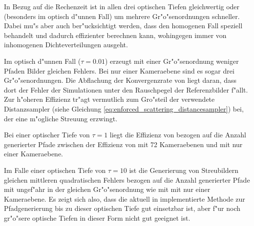 	In Bezug auf die Rechenzeit ist \pirate in allen drei optischen Tiefen gleichwertig oder (besonders im optisch d"unnen Fall) um mehrere Gr"o"senordnungen schneller. Dabei mu"s aber auch ber"ucksichtigt werden, dass \pirate den homogenen Fall speziell behandelt und dadurch effizienter berechnen kann, wohingegen \mctd immer von inhomogenen Dichteverteilungen ausgeht.
	
	Im optisch d"unnen Fall ($\tau=0.01$) erzeugt \pirate mit einer Gr"o"senordnung weniger Pfaden Bilder gleichen Fehlers. Bei nur einer Kameraebene sind es sogar drei Gr"o"senordnungen. Die Abflachung der Konvergenzrate von \pirate liegt daran, dass dort der Fehler der Simulationen unter den Rauschpegel der Referenzbilder f"allt. Zur h"oheren Effizienz tr"agt vermutlich zum Gro"steil der verwendete Distanzsampler (siehe Gleichung \ref{eq:enforced_scattering_distancesampler}) bei, der eine m"ogliche Streuung erzwingt.
	
	Bei einer optischer Tiefe von $\tau=1$ liegt die Effizienz von \pirate bezogen auf die Anzahl generierter Pfade zwischen der Effizienz von \mctd mit 72 Kameraebenen und \mctd mit nur einer Kameraebene.
	
	Im Falle einer optischen Tiefe von $\tau=10$ ist die Generierung von Streubildern gleichen mittleren quadratischen Fehlers bezogen auf die Anzahl generierter Pfade mit \pirate ungef"ahr in der gleichen Gr"o"senordnung wie mit \mctd mit nur einer Kameraebene. Es zeigt sich also, dass die aktuell in \pirate implementierte Methode zur Pfadgenerierung bis zu dieser optischen Tiefe gut einsetzbar ist, aber f"ur noch gr"o"sere optische Tiefen in dieser Form nicht gut geeignet ist.

